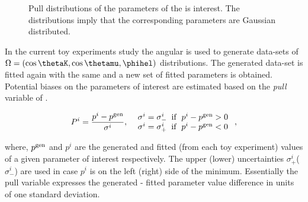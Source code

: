 \begin{figure}[h]
  \centering
  \begin{subfigure}{0.5\textwidth}
    \scalebox{0.60}{}
    \caption{}
    \label{pull_ACP0}
  \end{subfigure}%
  \hfill%
  \begin{subfigure}{0.5\textwidth}
    \scalebox{0.60}{}
    \caption{}
    \label{pull_ACPperp}
  \end{subfigure}
  \begin{subfigure}{0.5\textwidth}
    \scalebox{0.60}{}
    \caption{}
    \label{pull_ACPpar}
  \end{subfigure}%
  \hfill%
  \begin{subfigure}{0.5\textwidth}
    \scalebox{0.60}{}
    \caption{}
    \label{pull_ACPS}
  \end{subfigure}
\caption{Pull distributions of the parameters of the \Acp{i} interest. The distributions imply that the corresponding parameters are Gaussian distributed.}
\label{pull_acp}
\end{figure}

In the current toy experiments study the angular \pdf is used to generate data-sets of $\Omega = (\cos\thetaK,\cos\thetamu,\phihel)$
distributions. The generated data-set is fitted again with the same \pdf and a new set of fitted parameters is obtained. Potential
biases on the parameters of interest are estimated based on the {\it pull} variable of .

\begin{equation}
P^i = \frac{p^i - p^{\rm gen}}{ \sigma^i },\;\;\left.
  \begin{array}{ll}
    \sigma^i = \sigma^i_- \;\;{\rm if}\;\; p^i - p^{\rm gen} > 0   \\
    \sigma^i = \sigma^i_+ \;\;{\rm if}\;\; p^i - p^{\rm gen} < 0
  \end{array} \right. ,
\label{pull_def}
\end{equation}

\noindent where, $p^{\rm gen}$ and $p^i$ are the generated and fitted (from each toy experiment) values of a given parameter of interest
respectively. The upper (lower) uncertainties $\sigma^i_+$($\sigma^i_-$) are used in case $p^i$ is on the left (right) side of the minimum.
Essentially the pull variable expresses the generated - fitted parameter value difference in units of one standard deviation.

